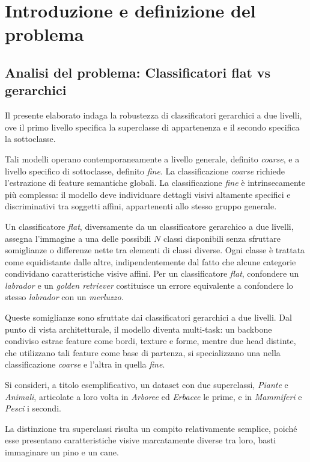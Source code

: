 \chapter{Introduzione e definizione del problema}

\section{Analisi del problema: Classificatori flat vs gerarchici}

Il presente elaborato indaga la robustezza di classificatori gerarchici a due livelli, ove il primo livello specifica la superclasse di appartenenza e il secondo specifica la sottoclasse.

Tali modelli operano contemporaneamente a livello generale, definito \textit{coarse}, e a livello specifico di sottoclasse, definito \textit{fine}. La classificazione \textit{coarse} richiede l’estrazione di feature semantiche globali. La classificazione \textit{fine} è intrinsecamente più complessa: il modello deve individuare dettagli visivi altamente specifici e discriminativi tra soggetti affini, appartenenti allo stesso gruppo generale.

Un classificatore \textit{flat}, diversamente da un classificatore gerarchico a due livelli, assegna l’immagine a una delle possibili $N$ classi disponibili senza sfruttare somiglianze o differenze nette tra elementi di classi diverse. Ogni classe è trattata come equidistante dalle altre, indipendentemente dal fatto che alcune categorie condividano caratteristiche visive affini. Per un classificatore \textit{flat}, confondere un \textit{labrador} e un \textit{golden retriever} costituisce un errore equivalente a confondere lo stesso \textit{labrador} con un \textit{merluzzo}.

Queste somiglianze sono sfruttate dai classificatori gerarchici a due livelli. Dal punto di vista architetturale, il modello diventa multi-task: un backbone condiviso estrae feature come bordi, texture e forme, mentre due head distinte, che utilizzano tali feature come base di partenza, si specializzano una nella classificazione \textit{coarse} e l’altra in quella \textit{fine}.

Si consideri, a titolo esemplificativo, un dataset con due superclassi, \textit{Piante} e \textit{Animali}, articolate a loro volta in \textit{Arboree} ed \textit{Erbacee} le prime, e in \textit{Mammiferi} e \textit{Pesci} i secondi.

La distinzione tra superclassi risulta un compito relativamente semplice, poiché esse presentano caratteristiche visive marcatamente diverse tra loro, basti immaginare un pino e un cane.

